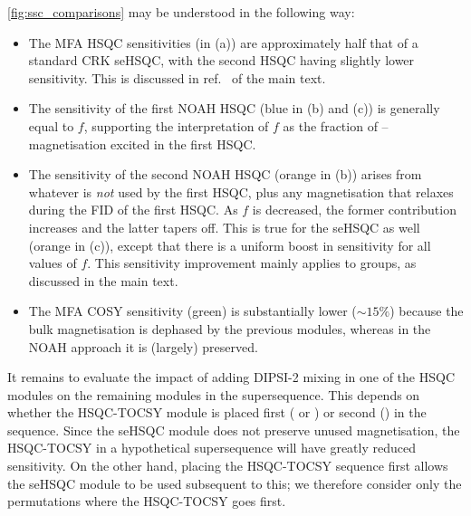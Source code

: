 \cref{fig:ssc_comparisons} may be understood in the following way:

\begin{itemize}
    \item The MFA HSQC sensitivities (in (a)) are approximately half that of a standard CRK seHSQC, with the second HSQC having slightly lower sensitivity.
        This is discussed in ref.\  of the main text.
    \item The sensitivity of the first NOAH HSQC (blue in (b) and (c)) is generally equal to $f$, supporting the interpretation of $f$ as the fraction of \carbon{}--\proton{} magnetisation excited in the first HSQC.
    \item The sensitivity of the second NOAH HSQC (orange in (b)) arises from whatever is \textit{not} used by the first HSQC, plus any magnetisation that relaxes during the FID of the first HSQC.
        As $f$ is decreased, the former contribution increases and the latter tapers off.
        This is true for the seHSQC as well (orange in (c)), except that there is a uniform boost in sensitivity for all values of $f$.
        This sensitivity improvement mainly applies to  groups, as discussed in the main text.
    \item The MFA COSY sensitivity (green) is substantially lower ($\sim 15\%$) because the bulk magnetisation is dephased by the previous modules, whereas in the NOAH approach it is (largely) preserved.
\end{itemize}

It remains to evaluate the impact of adding DIPSI-2 mixing in one of the HSQC modules on the remaining modules in the supersequence.
This depends on whether the HSQC-TOCSY module is placed first ( or ) or second () in the sequence.
Since the seHSQC module does not preserve unused  magnetisation, the HSQC-TOCSY in a hypothetical  supersequence will have greatly reduced sensitivity.
On the other hand, placing the HSQC-TOCSY sequence first allows the seHSQC module to be used subsequent to this; we therefore consider only the permutations where the HSQC-TOCSY goes first.

